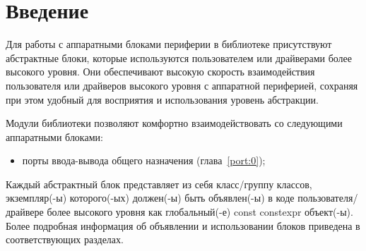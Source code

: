 \chapter{Введение}
Для работы с аппаратными блоками периферии в библиотеке присутствуют абстрактные блоки, которые используются пользователем или драйверами более высокого уровня. Они обеспечивают высокую скорость взаимодействия пользователя или драйверов высокого уровня с аппаратной периферией, сохраняя при этом удобный для восприятия и использования уровень абстракции.

Модули библиотеки позволяют комфортно взаимодействовать со следующими аппаратными блоками:
\begin{itemize}
	\item порты ввода-вывода общего назначения (глава~\ref{port:0});
\end{itemize}

Каждый абстрактный блок представляет из себя класс/группу классов, экземпляр(-ы) которого(-ых) должен(-ы) быть объявлен(-ы) в коде пользователя/драйвере более высокого уровня как гло\-баль\-ный(-е) const constexpr объект(-ы). Более подробная информация об объявлении и использовании блоков приведена в соответствующих разделах.